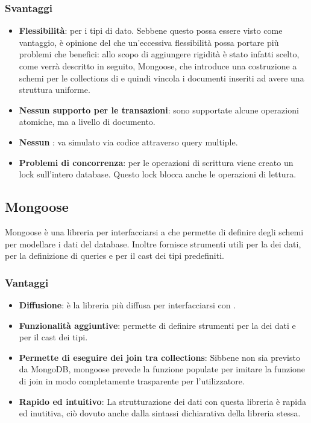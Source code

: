 \subsubsection{Svantaggi}
\begin{itemize}
\item \textbf{Flessibilità}: per i tipi di dato. Sebbene questo possa essere visto come vantaggio, è opinione del  che un'eccessiva flessibilità possa portare più problemi che benefici: allo scopo di aggiungere rigidità è stato infatti scelto, come verrà descritto in seguito, Mongoose, che introduce una costruzione a schemi per le collections di  e quindi vincola i documenti inseriti ad avere una struttura uniforme.
\item \textbf{Nessun supporto per le transazioni}: sono supportate alcune operazioni atomiche, ma a livello di documento.
\item \textbf{Nessun }: va simulato via codice attraverso query multiple.
\item \textbf{Problemi di concorrenza}: per le operazioni di scrittura viene creato un lock sull'intero database. Questo lock blocca anche le operazioni di lettura.
\end{itemize}

\subsection{Mongoose}
Mongoose \`e una libreria per interfacciarsi a  che permette di definire degli schemi per modellare i dati del database. Inoltre fornisce strumenti utili per la  dei dati, per la definizione di queries e per il cast dei tipi predefiniti. \\
\subsubsection{Vantaggi}
\begin{itemize}
\item \textbf{Diffusione}: \`e la libreria pi\`u diffusa per interfacciarsi con .
\item \textbf{Funzionalit\`a aggiuntive}: permette di definire strumenti per la  dei dati e per il cast dei tipi.
\item \textbf{Permette di eseguire dei join tra collections}: Sibbene non sia previsto da MongoDB, mongoose prevede la funzione populate per imitare la funzione di join in modo completamente trasparente per l'utilizzatore.
\item \textbf{Rapido ed intuitivo}: La strutturazione dei dati con questa libreria è rapida ed inutitiva, ciò dovuto anche dalla sintassi dichiarativa della libreria stessa.
\end{itemize}
